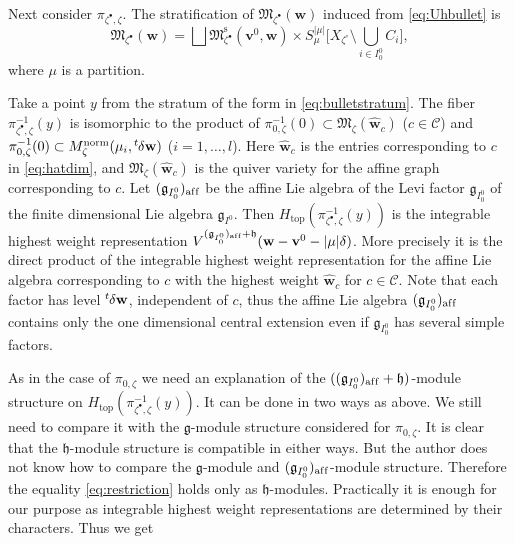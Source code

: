 \documentclass[pdftex]{sigma}
\theoremstyle{definition}
\numberwithin{equation}{section}
\newcommand{\lsp}[2]{{\mskip-.3mu}{}^{#1}\mskip-1mu{#2}}
\newcommand{\g}{{\mathfrak g}}
\newcommand{\h}{{\mathfrak h}}
\newcommand{\M}{{\mathfrak M}} %
\newcommand{\Mreg}{\M^{\operatorname{s}}}
\newcommand{\bv}{{\mathbf v}} %
\newcommand{\bw}{{\mathbf w}} %
\newcommand{\topdeg}{{\operatorname{top}}} %
\newcommand{\aff}{\mathrm{af\/f}}
\newcommand{\affLevi}{(\g_{I_0^0})_{\aff}}
\begin{document}
Next consider $\pi_{\zeta^\bullet,\zeta}$.
%
The stratif\/ication of $\M_{\zeta^\bullet}(\bw)$ induced from
\eqref{eq:Uhbullet} is{\samepage
\begin{equation}\label{eq:bulletstratum}
  \M_{\zeta^\bullet}(\bw)
= \bigsqcup \Mreg_{\zeta^\bullet}(\bv^0,\bw)
  \times S^{|\mu|}_\mu
  \Big[X_{\zeta^\circ}\setminus \bigcup_{i\in I_0^0} C_i \Big],
\end{equation}
where $\mu$ is a partition.}

Take a point $y$ from the stratum of the form in
\eqref{eq:bulletstratum}. The f\/iber
$\pi_{\zeta^\bullet,\zeta}^{-1}(y)$ is isomorphic to the product of
$\pi_{0,\zeta}^{-1}(0)\subset \M_\zeta(\widehat\bw_c)$ ($c\in \mathcal
C$) and $\pi_{0,\zeta}^{-1}(0)\subset
M_\zeta^{\text{norm}}(\mu_i,\lsp{t}{\delta}\bw)$ ($i=1,\dots, l$).
Here $\widehat\bw_c$ is the entries corresponding to $c$ in
\eqref{eq:hatdim}, and $\M_\zeta(\widehat\bw_c)$ is the quiver variety
for the af\/f\/ine graph corresponding to $c$.
%
Let $\affLevi$ be the af\/f\/ine Lie algebra of the Levi factor
$\g_{I_0^0}$ of the f\/inite dimensional Lie algebra $\g_{I^0}$.
Then $H_{\topdeg}(\pi_{\zeta^\bullet,\zeta}^{-1}(y))$ is the
integrable highest weight representation
$V^{\affLevi+\mathfrak h}(\bw - \bv^0 - |\mu|\delta)$.
%
More precisely it is the direct product of the integrable highest
weight representation for the af\/f\/ine Lie algebra corresponding to $c$
with the highest weight $\widehat\bw_c$ for $c\in\mathcal C$.
%
Note that each factor has level $\lsp{t}{\delta}\bw$, independent of
$c$, thus the af\/f\/ine Lie algebra $\affLevi$ contains only
the one dimensional central extension even if $\g_{I^0_0}$ has several
simple factors.

As in the case of $\pi_{0,\zeta}$ we need an explanation of the
$(\affLevi+\mathfrak h)$-module structure on
$H_{\topdeg}(\pi_{\zeta^\bullet,\zeta}^{-1}(y))$. It can be done in
two ways as above. We still need to compare it with the $\g$-module
structure considered for $\pi_{0,\zeta}$.
%
It is clear that the $\h$-module structure is compatible in either
ways. But the author does not know how to compare the $\g$-module and
$\affLevi$-module structure.
%
Therefore the equality \eqref{eq:restriction} holds only as $\mathfrak
h$-modules. Practically it is enough for our purpose as integrable
highest weight representations are determined by their characters.
%
Thus we get
\end{document}
